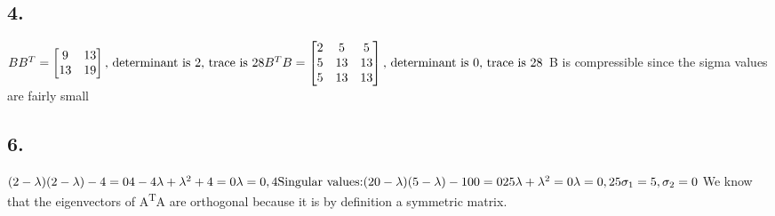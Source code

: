 \documentclass{article}
\begin{document}
\subsection*{4.}
\begin{math}
BB^T=\begin{bmatrix}9&13\\13&19\end{bmatrix}\text{, determinant is 2, trace is 28}\\
B^TB=\begin{bmatrix}2&5&5\\5&13&13\\5&13&13\end{bmatrix}\text{, determinant is 0, trace is 28}\\
\end{math}
B is compressible since the sigma values are fairly small
\subsection*{6.}
\begin{math}
(2-\lambda)(2-\lambda)-4=0\\
4-4\lambda+\lambda^2+4=0\\
\lambda=0,4\\
\text{Singular values:}\\
(20-\lambda)(5-\lambda)-100=0\\
25\lambda+\lambda^2=0\\
\lambda=0,25\\
\sigma_1=5,\sigma_2=0\\
\end{math}
We know that the eigenvectors of A\textsuperscript{T}A are orthogonal because it is by definition a symmetric matrix. 

\appendix
\end{document}
